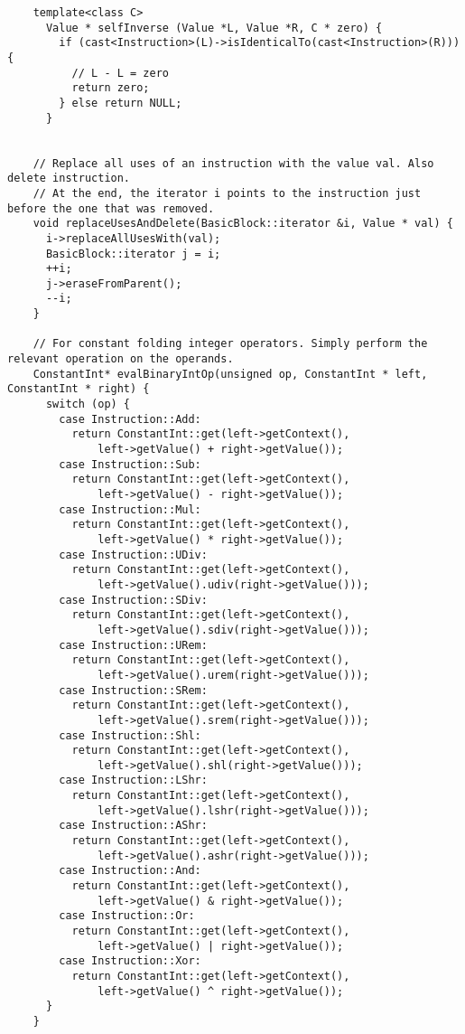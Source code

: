 \documentclass[12pt]{article}
\begin{document}
\begin{verbatim}
    template<class C>
      Value * selfInverse (Value *L, Value *R, C * zero) {
        if (cast<Instruction>(L)->isIdenticalTo(cast<Instruction>(R))) {
          // L - L = zero
          return zero;
        } else return NULL;
      }


    // Replace all uses of an instruction with the value val. Also delete instruction. 
    // At the end, the iterator i points to the instruction just before the one that was removed.
    void replaceUsesAndDelete(BasicBlock::iterator &i, Value * val) {
      i->replaceAllUsesWith(val);
      BasicBlock::iterator j = i;
      ++i;
      j->eraseFromParent();
      --i;
    }

    // For constant folding integer operators. Simply perform the relevant operation on the operands.
    ConstantInt* evalBinaryIntOp(unsigned op, ConstantInt * left, ConstantInt * right) {
      switch (op) {
        case Instruction::Add:
          return ConstantInt::get(left->getContext(), 
              left->getValue() + right->getValue());
        case Instruction::Sub:
          return ConstantInt::get(left->getContext(), 
              left->getValue() - right->getValue());
        case Instruction::Mul:
          return ConstantInt::get(left->getContext(), 
              left->getValue() * right->getValue());
        case Instruction::UDiv:
          return ConstantInt::get(left->getContext(), 
              left->getValue().udiv(right->getValue()));
        case Instruction::SDiv:
          return ConstantInt::get(left->getContext(), 
              left->getValue().sdiv(right->getValue()));
        case Instruction::URem:
          return ConstantInt::get(left->getContext(), 
              left->getValue().urem(right->getValue()));
        case Instruction::SRem:
          return ConstantInt::get(left->getContext(), 
              left->getValue().srem(right->getValue()));
        case Instruction::Shl:
          return ConstantInt::get(left->getContext(), 
              left->getValue().shl(right->getValue()));
        case Instruction::LShr:
          return ConstantInt::get(left->getContext(), 
              left->getValue().lshr(right->getValue()));
        case Instruction::AShr:
          return ConstantInt::get(left->getContext(), 
              left->getValue().ashr(right->getValue()));
        case Instruction::And:
          return ConstantInt::get(left->getContext(), 
              left->getValue() & right->getValue());
        case Instruction::Or:
          return ConstantInt::get(left->getContext(), 
              left->getValue() | right->getValue());
        case Instruction::Xor:
          return ConstantInt::get(left->getContext(), 
              left->getValue() ^ right->getValue());
      }
    }


\end{verbatim}
\end{document}
